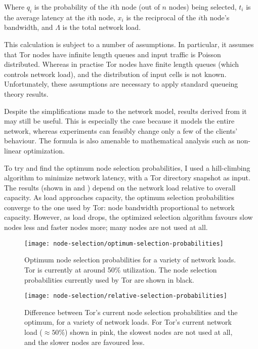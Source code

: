 \documentclass{article}
\begin{document}
Where $q_i$ is the probability of the $i$th node (out of $n$ nodes) being selected, $t_i$ is the average latency at the $i$th node, $x_i$ is the reciprocal of the $i$th node's bandwidth, and $\Lambda$ is the total network load.

This calculation is subject to a number of assumptions.
In particular, it assumes that Tor nodes have infinite length queues and input traffic is Poisson distributed.
Whereas in practise Tor nodes have finite length queues (which controls network load), and the distribution of input cells is not known.
Unfortunately, these assumptions are necessary to apply standard queueing theory results.

Despite the simplifications made to the network model, results derived from it may still be useful.
This is especially the case because it models the entire network, whereas experiments can feasibly change only a few of the clients' behaviour.
The formula is also amenable to mathematical analysis such as non-linear optimization.

To try and find the optimum node selection probabilities, I used a hill-climbing algorithm to minimize network latency, with a Tor directory snapshot as input.
The results (shown in  and ) depend on the network load relative to overall capacity.
As load approaches capacity, the optimum selection probabilities converge to the one used by Tor: node bandwidth proportional to network capacity.
However, as load drops, the optimized selection algorithm favours slow nodes less and faster nodes more; many nodes are not used at all.

\begin{figure}
\texttt{[image: node-selection/optimum-selection-probabilities]}
\caption{Optimum node selection probabilities for a variety of network loads. Tor is currently at around 50\% utilization. The node selection probabilities currently used by Tor are shown in black.}
\label{fig:optimum-selection}
\end{figure}

\begin{figure}
\texttt{[image: node-selection/relative-selection-probabilities]}
\caption{Difference between Tor's current node selection probabilities and the optimum, for a variety of network loads. For Tor's current network load ($\approx 50$\%) shown in pink, the slowest nodes are not used at all, and the slower nodes are favoured less.}
\label{fig:relative-selection}
\end{figure}
\end{document}
